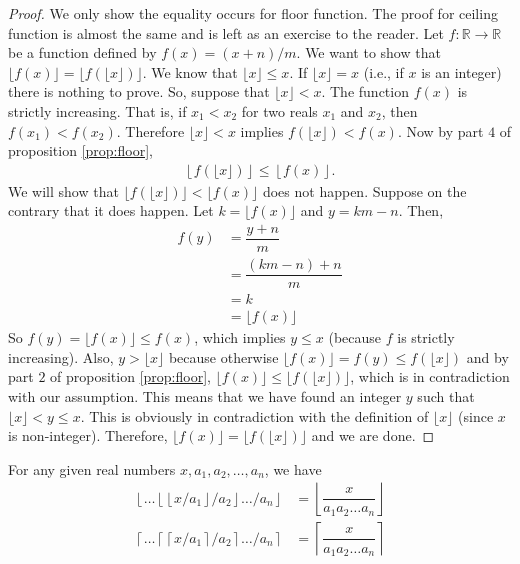 \documentclass{subfile}
\begin{document}
\begin{proof}
	We only show the equality occurs for floor function. The proof for ceiling function is almost the same and is left as an exercise to the reader. Let $f: \mathbb{R} \to \mathbb{R}$ be a function defined by $f(x)=(x+n)/m$. We want to show that $\lfloor f(x) \rfloor = \lfloor f(\lfloor x \rfloor) \rfloor$. We know that $\lfloor x \rfloor \leq x$. If $\lfloor x \rfloor = x$ (i.e., if $x$ is an integer) there is nothing to prove. So, suppose that $\lfloor x \rfloor < x$. The function $f(x)$ is strictly increasing. That is, if $x_1<x_2$ for two reals $x_1$ and $x_2$, then $f(x_1) < f(x_2)$. Therefore $\lfloor x \rfloor < x$ implies $f(\lfloor x \rfloor) < f(x)$. Now by part $4$ of proposition \ref{prop:floor},
	\begin{align*}
		\left\lfloor  f(\lfloor x \rfloor)\right\rfloor   \leq \left\lfloor  f(x) \right\rfloor .
	\end{align*}
	We will show that $\lfloor f(\lfloor x \rfloor)\rfloor  < \lfloor f(x) \rfloor$ does not happen. Suppose on the contrary that it does happen. Let $k =  \lfloor f(x) \rfloor$ and $y=km-n$. Then,
	\begin{align*}
		f(y) &= \dfrac{y+n}{m}\\
		&= \dfrac{(km-n)+n}{m}\\
		&= k\\
		&= \lfloor f(x) \rfloor
	\end{align*}
	So $f(y)=\lfloor f(x) \rfloor \leq f(x)$, which implies $y \leq x$ (because $f$ is strictly increasing). Also, $y > \lfloor x \rfloor$ because otherwise $\lfloor f(x) \rfloor = f(y) \leq  f(\lfloor x \rfloor)$ and by part $2$ of proposition \ref{prop:floor}, $\lfloor f(x) \rfloor \leq \lfloor f(\lfloor x \rfloor)\rfloor$, which is in contradiction with our assumption. This means that we have found an integer $y$ such that $\lfloor x \rfloor < y \leq x$. This is obviously in contradiction with the definition of $\lfloor x \rfloor$ (since $x$ is non-integer). Therefore, $\lfloor f(x) \rfloor = \lfloor f(\lfloor x \rfloor) \rfloor$ and we are done.
\end{proof}

\begin{corollary}
	For any given real numbers $x, a_1, a_2, \ldots, a_n$, we have
	\begin{align*}
		\left\lfloor  \ldots \left\lfloor  \left\lfloor  x/a_1 \right\rfloor /a_2 \right\rfloor  \ldots/a_n \right\rfloor
			&= \left\lfloor  \dfrac{x}{a_1a_2\ldots a_n}\right\rfloor \\
		\left\lceil \ldots \left\lceil \left\lceil x/a_1 \right\rceil /a_2 \right\rceil  \ldots/a_n \right\rceil
			&= \left\lceil \dfrac{x}{a_1a_2\ldots a_n}\right\rceil
	\end{align*}
\end{corollary}
\end{document}
